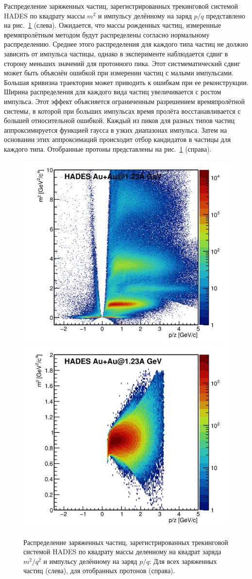 Распределение заряженных частиц, зарегистрированных трекинговой системой HADES по квадрату массы $m^2$ и импульсу делённому на заряд $p/q$ представлено на рис.~\ref{fig:hades_m2_pq} (слева).
Ожидается, что массы рожденных частиц, измеренные времяпролётным методом будут распределены согласно нормальному распределению.
Среднее этого распределения для каждого типа частиц не должно зависить от импульса частицы, однако в эксперименте наблюдается сдвиг в сторону меньших значений для протонного пика.
Этот систмематический сдвиг может быть объяснён ошибкой при измерении частиц с малыми импульсами.
Большая кривизна траектории может приводить к ошибкам при ее реконструкции.
Ширина распределения для каждого вида частиц увеличивается с ростом импульса.
Этот эффект объясняется ограниченным разрешением времяпролётной системы, в которой при больших импульсах время пролёта восстанавливается с большей относительной ошибкой.
Каждый из пиков для разных типов частиц аппроксимируется функцией гаусса в узких диапазонах импульса.
Затем на основании этих аппроксимаций происходит отбор кандидатов в частицы для каждого типа.
Отобранные протоны представлены на рис.~\ref{fig:hades_m2_pq} (справа).
%
\begin{figure}[ht]
\begin{center}
\includegraphics[width=0.45\linewidth]{images/au123_m2_vs_pq_all.png}
\includegraphics[width=0.45\linewidth]{images/au123_m2_vs_pq_protons.png}
\caption{Распределение заряженных частиц, зарегистрированных трекинговой системой HADES по квадрату массы деленному на квадрат заряда $m^2/q^2$ и импульсу делённому на заряд $p/q$: Для всех заряженных частиц (слева), для отобранных протонов (справа).}
\label{fig:hades_m2_pq}
\end{center}
\end{figure}

